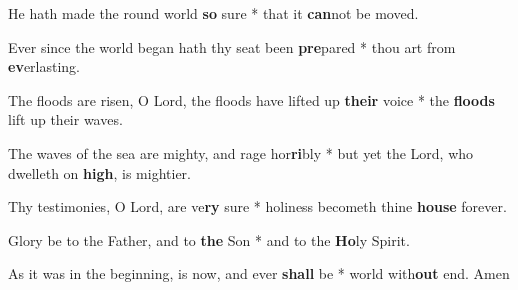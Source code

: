 \begin{multicols}{2}
	He hath made the round world \textbf{so} sure * that it \textbf{can}not be moved.
	
	Ever since the world began hath thy seat been \textbf{pre}pared * thou art from \textbf{ev}erlasting.
	
	The floods are risen, O Lord, the floods have lifted up \textbf{their} voice * the \textbf{floods} lift up their waves.
	
	The waves of the sea are mighty, and rage hor\textbf{ri}bly * but yet the Lord, who dwelleth on \textbf{high}, is mightier.
	
	Thy testimonies, O Lord, are ve\textbf{ry} sure * holiness becometh thine \textbf{house} forever.
	
	Glory be to the Father, and to \textbf{the} Son * and to the \textbf{Ho}ly Spirit.
	
	As it was in the beginning, is now, and ever \textbf{shall} be * world with\textbf{out} end. Amen
\end{multicols}